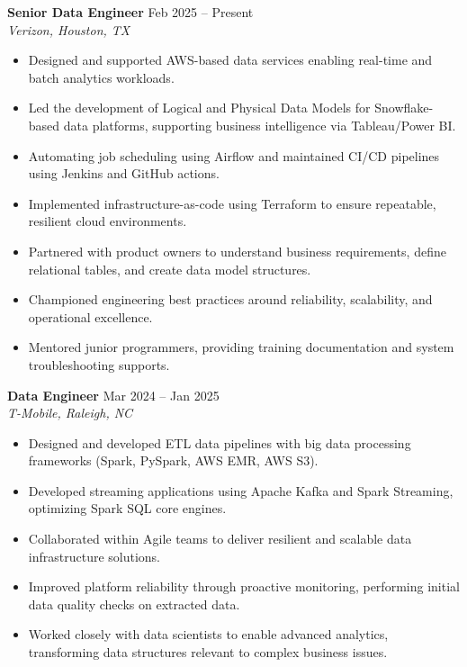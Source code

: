 \documentclass[10pt]{article} %
\begin{document}
\textbf{Senior Data Engineer} \hfill Feb 2025 -- Present \\
\textit{Verizon, Houston, TX}
\begin{itemize}[leftmargin=*, itemsep=3pt]
    \item Designed and supported AWS-based data services enabling real-time and batch analytics workloads. %
    \item Led the development of Logical and Physical Data Models for Snowflake-based data platforms, supporting business intelligence via Tableau/Power BI. %
    \item Automating job scheduling using Airflow and maintained CI/CD pipelines using Jenkins and GitHub actions. %
    \item Implemented infrastructure-as-code using Terraform to ensure repeatable, resilient cloud environments. %
    \item Partnered with product owners to understand business requirements, define relational tables, and create data model structures. %
    \item Championed engineering best practices around reliability, scalability, and operational excellence. %
    \item Mentored junior programmers, providing training documentation and system troubleshooting supports. %
\end{itemize}

\textbf{Data Engineer} \hfill Mar 2024 -- Jan 2025 \\
\textit{T-Mobile, Raleigh, NC}
\begin{itemize}[leftmargin=*, itemsep=3pt]
    \item Designed and developed ETL data pipelines with big data processing frameworks (Spark, PySpark, AWS EMR, AWS S3). %
    \item Developed streaming applications using Apache Kafka and Spark Streaming, optimizing Spark SQL core engines. %
    \item Collaborated within Agile teams to deliver resilient and scalable data infrastructure solutions. %
    \item Improved platform reliability through proactive monitoring, performing initial data quality checks on extracted data. %
    \item Worked closely with data scientists to enable advanced analytics, transforming data structures relevant to complex business issues. %
\end{itemize}
\end{document}
